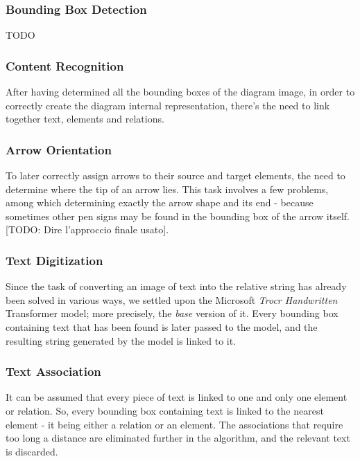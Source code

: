\documentclass[conference]{IEEEtran}
\begin{document}
\subsubsection{Bounding Box Detection}
TODO\\
\subsubsection{Content Recognition}
After having determined all the bounding boxes of the diagram image, in order to correctly create the diagram internal representation, there's the need to link together text, elements and relations.\\

\subsubsection{Arrow Orientation}
To later correctly assign arrows to their source and target elements, the need to determine where the tip of an arrow lies. This task involves a few problems, among which determining exactly the arrow shape and its end - because sometimes other pen signs may be found in the bounding box of the arrow itself. [TODO: Dire l'approccio finale usato]. \\

\subsubsection{Text Digitization}
Since the task of converting an image of text into the relative string has already been solved in various ways, we settled upon the Microsoft \textit{Trocr Handwritten} Transformer model; more precisely, the \textit{base} version of it. Every bounding box containing text that has been found is later passed to the model, and the resulting string generated by the model is linked to it.\\

\subsubsection{Text Association}
It can be assumed that every piece of text is linked to one and only one element or relation. So, every bounding box containing text is linked to the nearest element - it being either a relation or an element. The associations that require too long a distance are eliminated further in the algorithm, and the relevant text is discarded.\\
\end{document}
